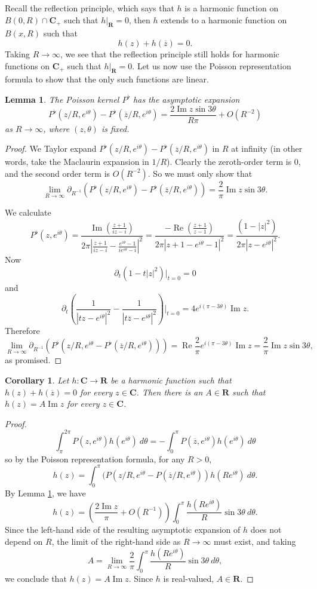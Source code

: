 \documentclass[12pt]{report}
\newcommand{\RR}{\mathbf{R}}
\newcommand{\CC}{\mathbf{C}}
\renewcommand{\Re}{\operatorname{Re}}
\renewcommand{\Im}{\operatorname{Im}}
\newtheorem{lemma}[theorem]{Lemma}
\newtheorem{corollary}[theorem]{Corollary}
\theoremstyle{definition}
\begin{document}
Recall the reflection principle, which says that $h$ is a harmonic function on $B(0, R) \cap \CC_+$ such that $h|_\RR = 0$, then $h$ extends to a harmonic function on $B(x, R)$ such that
$$h(z) + h(\overline z) = 0.$$
Taking $R \to \infty$, we see that the reflection principle still holds for harmonic functions on $\CC_+$ such that $h|_\RR = 0$. Let us now use the Poisson representation formula to show that the only such functions are linear.
\begin{lemma}
\label{asymptotics for the poisson kernel}
The Poisson kernel $P^\flat$ has the asymptotic expansion
$$P^\flat(z/R, e^{i\theta}) - P^\flat(\overline z/R, e^{i\theta}) = \frac{2\Im z \sin 3\theta}{R\pi} + O(R^{-2})$$
as $R \to \infty$, where $(z, \theta)$ is fixed.
\end{lemma}
\begin{proof}
We Taylor expand $P^\flat(z/R, e^{i\theta}) - P^\flat(\overline z/R, e^{i\theta})$ in $R$ at infinity (in other words, take the Maclaurin expansion in $1/R$). Clearly the zeroth-order term is $0$, and the second order term is $O(R^{-2})$. So we must only show that
$$\lim_{R \to \infty} \partial_{R^{-1}}(P^\flat(z/R, e^{i\theta}) - P^\flat(\overline z/R, e^{i\theta})) = \frac{2}{\pi} \Im z \sin 3\theta.$$

We calculate
$$P^\flat(z, e^{i\theta}) = \frac{\Im\left(\frac{z+1}{iz-i}\right)}{2\pi\left|\frac{z+1}{iz-i} - \frac{e^{i\theta} - 1}{ie^{i\theta} -i}\right|^2}
  = \frac{-\Re\left(\frac{z+1}{z-1}\right)}{2\pi|z + 1 - e^{i\theta} - 1|^2} = \frac{(1 - |z|^2)}{2\pi|z - e^{i\theta}|^2}.$$
Now
$$\partial_t (1 - t|z|^2)|_{t=0} = 0$$
and
$$\partial_t \left(\frac{1}{|tz - e^{i\theta}|^2} - \frac{1}{|t\overline z - e^{i\theta}|^2}\right)|_{t = 0} = 4e^{i(\pi - 3\theta)}\Im z.$$
Therefore
$$\lim_{R \to \infty} \partial_{R^{-1}}(P^\flat(z/R, e^{i\theta} - P^\flat(\overline z/R, e^{i\theta}))) = \Re \frac{2}{\pi}e^{i(\pi - 3\theta)}\Im z = \frac{2}{\pi} \Im z \sin 3\theta,$$
as promised.
\end{proof}
\begin{corollary}
\label{reflected harmonics are linear}
Let $h: \CC \to \RR$ be a harmonic function such that $h(z) + h(\overline z) = 0$ for every $z \in \CC$. Then there is an $A \in \RR$ such that $h(z) = A \Im z$ for every $z \in \CC$.
\end{corollary}
\begin{proof}
  $$\int_\pi^{2\pi} P(z, e^{i\theta})h(e^{i\theta}) ~d\theta = -\int_0^\pi P(\overline z, e^{i\theta})h(e^{i\theta}) ~d\theta$$
  so by the Poisson representation formula, for any $R > 0$,
  $$h(z) = \int_0^\pi (P(z/R, e^{i\theta} - P(\overline z/R, e^{i\theta}))h(Re^{i\theta})~d\theta.$$
  By Lemma \ref{asymptotics for the poisson kernel}, we have
  $$h(z) = \left(\frac{2\Im z}{\pi} + O(R^{-1})\right)\int_0^\pi \frac{h(Re^{i\theta})}{R}\sin 3\theta ~d\theta.$$
  Since the left-hand side of the resulting asymptotic expansion of $h$ does not depend on $R$, the limit of the right-hand side as $R \to \infty$ must exist, and taking
  $$A = \lim_{R \to \infty} \frac{2}{\pi}\int_0^\pi \frac{h(Re^{i\theta})}{R}\sin 3\theta ~d\theta,$$
  we conclude that $h(z) = A\Im z$. Since $h$ is real-valued, $A \in \RR$.
\end{proof}
\end{document}
